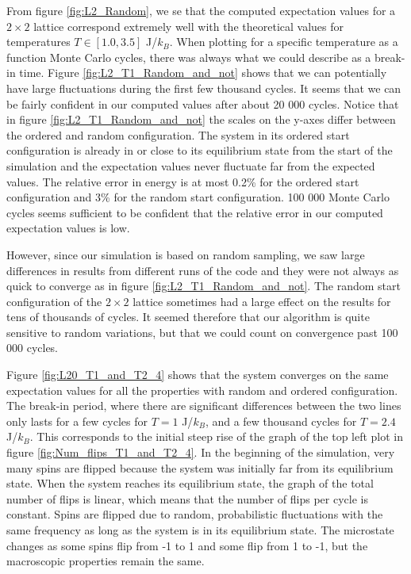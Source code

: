 \documentclass[reprint, english,notitlepage,nofootinbib]{revtex4-1}  %
\begin{document}
From figure \ref{fig:L2_Random}, we se that the computed expectation values for a $2 \times 2$ lattice correspond extremely well with the theoretical values for temperatures $T \in [1.0, 3.5]$ J/$k_B$. When plotting for a specific temperature as a function Monte Carlo cycles, there was always what we could describe as a break-in time. Figure \ref{fig:L2_T1_Random_and_not} shows that we can potentially have large fluctuations during the first few thousand cycles. It seems that we can be fairly confident in our computed values after about 20 000 cycles. Notice that in figure \ref{fig:L2_T1_Random_and_not} the scales on the y-axes differ between the ordered and random configuration. The system in its ordered start configuration is already in or close to its equilibrium state from the start of the simulation and the expectation values never fluctuate far from the expected values. The relative error in energy is at most 0.2\% for the ordered start configuration and 3\% for the random start configuration. 100 000 Monte Carlo cycles seems sufficient to be confident that the relative error in our computed expectation values is low.

However, since our simulation is based on random sampling, we saw large differences in results from different runs of the code and they were not always as quick to converge as in figure \ref{fig:L2_T1_Random_and_not}. The random start configuration of the $2 \times 2$ lattice sometimes had a large effect on the results for tens of thousands of cycles. It seemed therefore that our algorithm is quite sensitive to random variations, but that we could count on convergence past 100 000 cycles.

Figure \ref{fig:L20_T1_and_T2_4} shows that the system converges on the same expectation values for all the properties with random and ordered configuration. The break-in period, where there are significant differences between the two lines only lasts for a few cycles for $T = 1$ J/$k_B$, and a few thousand cycles for $T = 2.4$ J/$k_B$. This corresponds to the initial steep rise of the graph of the top left plot in figure \ref{fig:Num_flips_T1_and_T2_4}. In the beginning of the simulation, very many spins are flipped because the system was initially far from its equilibrium state. When the system reaches its equilibrium state, the graph of the total number of flips is linear, which means that the number of flips per cycle is constant. Spins are flipped due to random, probabilistic fluctuations with the same frequency as long as the system is in its equilibrium state. The microstate changes as some spins flip from -1 to 1 and some flip from 1 to -1, but the macroscopic properties remain the same.
\end{document}
